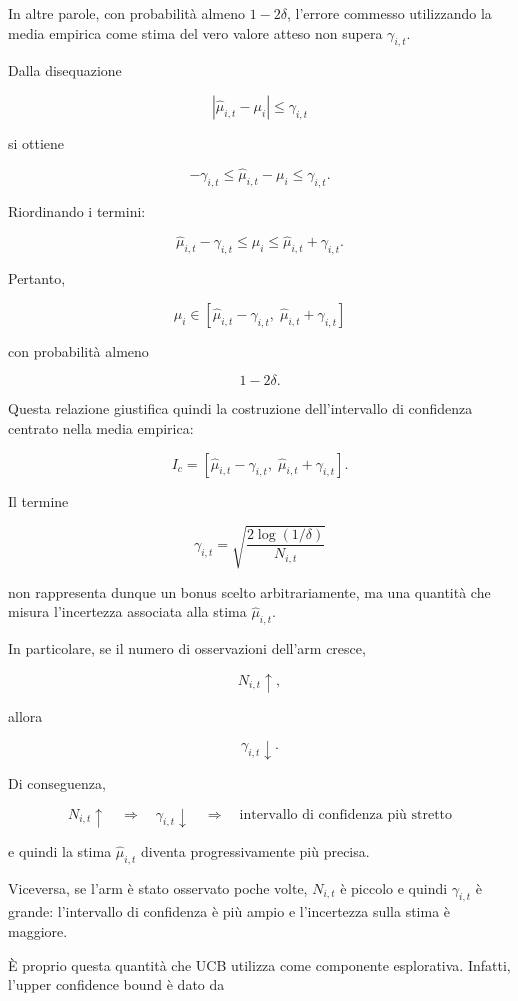 In altre parole, con probabilità almeno $1-2\delta$, l'errore commesso utilizzando la media empirica come stima del vero valore atteso non supera $\gamma_{i,t}$.

Dalla disequazione

\[
\left|
\widehat{\mu}_{i,t}-\mu_i
\right|
\le
\gamma_{i,t}
\]

si ottiene

\[
-\gamma_{i,t}
\le
\widehat{\mu}_{i,t}-\mu_i
\le
\gamma_{i,t}.
\]

Riordinando i termini:

\[
\widehat{\mu}_{i,t}-\gamma_{i,t}
\le
\mu_i
\le
\widehat{\mu}_{i,t}+\gamma_{i,t}.
\]

Pertanto,

\[
\boxed{
\mu_i
\in
\left[
\widehat{\mu}_{i,t}-\gamma_{i,t},
\;
\widehat{\mu}_{i,t}+\gamma_{i,t}
\right]
}
\]

con probabilità almeno

\[
\boxed{
1-2\delta
}.
\]

Questa relazione giustifica quindi la costruzione dell'intervallo di confidenza centrato nella media empirica:

\[
I_c
=
\left[
\widehat{\mu}_{i,t}-\gamma_{i,t},
\;
\widehat{\mu}_{i,t}+\gamma_{i,t}
\right].
\]

Il termine

\[
\gamma_{i,t}
=
\sqrt{
\frac{2\log(1/\delta)}
{N_{i,t}}
}
\]

non rappresenta dunque un bonus scelto arbitrariamente, ma una quantità che misura l'incertezza associata alla stima $\widehat{\mu}_{i,t}$.

In particolare, se il numero di osservazioni dell'arm cresce,

\[
N_{i,t}\uparrow,
\]

allora

\[
\gamma_{i,t}\downarrow.
\]

Di conseguenza,

\[
\boxed{
N_{i,t}\uparrow
\quad\Longrightarrow\quad
\gamma_{i,t}\downarrow
\quad\Longrightarrow\quad
\text{intervallo di confidenza più stretto}
}
\]

e quindi la stima $\widehat{\mu}_{i,t}$ diventa progressivamente più precisa.

Viceversa, se l'arm è stato osservato poche volte, $N_{i,t}$ è piccolo e quindi $\gamma_{i,t}$ è grande: l'intervallo di confidenza è più ampio e l'incertezza sulla stima è maggiore.

È proprio questa quantità che UCB utilizza come componente esplorativa. Infatti, l'upper confidence bound è dato da

